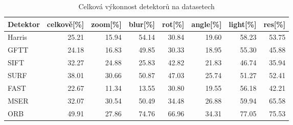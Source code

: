 \begin{table}[!ht]\centering
\begin{tabular}{ l| r r r r r r r }
	Detektor & celkově[\%] & zoom[\%] & blur[\%] & rot[\%] & angle[\%] & light[\%] & res[\%] \\
	\hline
	 Harris & 25.21 & 15.94 & 54.14 & 30.84 & 19.60 & 58.23 & 53.75 \\
	 GFTT & 24.18 & 16.83 & 49.85 & 30.33 & 18.95 & 55.30 & 45.88 \\
	 SIFT & 32.27 & 24.88 & 25.83 & 42.82 & 21.83 & 46.74 & 35.94 \\
	 SURF & 38.01 & 30.66 & 50.87 & 47.03 & 25.74 & 51.27 & 52.41 \\
	 FAST & 22.67 & 11.34 & 13.55 & 30.80 & 19.55 & 56.18 & 42.21 \\
	 MSER & 32.07 & 30.54 & 50.49 & 34.48 & 26.88 & 59.94 & 65.58 \\
	 ORB & 49.91 & 27.86 & 74.76 & 66.96 & 34.31 & 77.05 & 75.53
\end{tabular}
	\caption[Short Heading]{\protect Celková výkonnost detektorů na datasetech}\label{tab_detperf}
\end{table}
